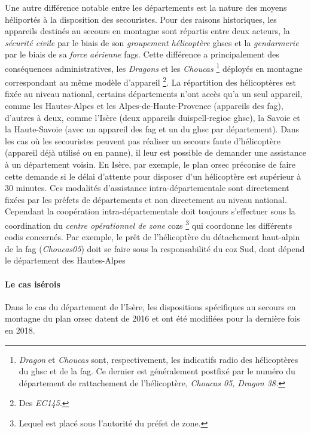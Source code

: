 Une autre différence notable entre les départements est la nature des
moyens héliportés à la disposition des secouristes. Pour des raisons
historiques, les appareils destinés au secours en montagne sont
répartis entre deux acteurs, la \emph{sécurité civile} par le biais de
son \emph{groupement hélicoptère} \acp{ghsc} et la \emph{gendarmerie}
par le biais de sa \emph{force aérienne} \acp{fag}. Cette différence a
principalement des conséquences administratives, les \emph{Dragons} et
les \emph{Choucas} \footnote{\emph{Dragon} et \emph{Choucas} sont,
  respectivement, les indicatifs radio des hélicoptères du \ac{ghsc}
  et de la \ac{fag}. Ce dernier est généralement postfixé par le
  numéro du département de rattachement de l'hélicoptère, \eg
  \emph{Choucas 05,} \emph{Dragon 38.}} déployés en montagne
correspondant au même modèle d'appareil \footnote{Des
  \emph{EC145}.}. La répartition des hélicoptères est fixée au niveau
national, certains départements n'ont accès qu'a un seul appareil,
comme les Hautes-Alpes et les Alpes-de-Haute-Provence (appareils des
\ac{fag}), d'autres à deux, comme l'Isère (deux appareils
duispell-regioc \ac{ghsc}), la Savoie et la Haute-Savoie (avec un
appareil des \ac{fag} et un du \ac{ghsc} par département). Dans les
cas où les secouristes peuvent pas réaliser un secours faute
d'hélicoptère (appareil déjà utilisé ou en panne), il leur est
possible de demander une assistance à un département voisin. En Isère,
par exemple, le plan \ac{orsec} préconise de faire cette demande si le
délai d'attente pour disposer d'un hélicoptère est supérieur à 30
minutes.
Ces modalités d'assistance intra-départementale sont directement
fixées par les préfets de départements et non directement au niveau
national. Cependant la coopération intra-départementale doit toujours
s'effectuer sous la coordination du \emph{centre opérationnel de zone}
\acp{coz} \footnote{Lequel est placé sous l'autorité du préfet de
  zone.} qui coordonne les différents \ac{codis} concernés. Par
exemple, le prêt de l'hélicoptère du détachement haut-alpin de la
\ac{fag} (\emph{Choucas05}) doit se faire sous la responsabilité du
\ac{coz} Sud, dont dépend le département des Hautes-Alpes

\paragraph{Le cas isérois}

Dans le cas du département de l'Isère, les dispositions spécifiques au
secours en montagne du plan \ac{orsec} datent de 2016 et ont été
modifiées pour la dernière fois en 2018.

